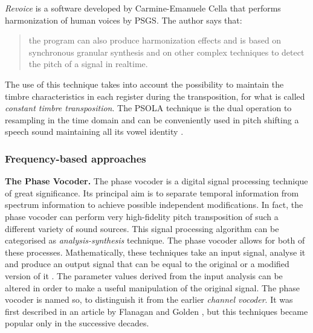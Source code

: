 \emph{Revoice} is a software developed by Carmine-Emanuele Cella that performs harmonization of human voices by PSGS. The author says that:

\begin{quote}
\scriptsize{the program can also produce harmonization effects and is based on synchronous granular synthesis and on other complex techniques to detect the pitch of a signal in realtime.
}
\end{quote}

The use of this technique takes into account the possibility to maintain the timbre characteristics in each register during the transposition, for what is called \emph{constant timbre transposition}. The PSOLA technique is the dual operation to resampling in the time domain and can be conveniently used in pitch shifting a speech sound maintaining all its vowel identity \cite{zolder2011dafx}.

\subsubsection{Frequency-based approaches}
\label{subsec:freq}

\textbf{The Phase Vocoder.}
The phase vocoder is a digital signal processing technique of great significance. Its principal aim is to separate temporal information from spectrum information to achieve possible independent modifications. In fact, the phase vocoder can perform very high-fidelity pitch transposition of such a different variety of sound sources. This signal processing algorithm can be categorised as \emph{analysis-synthesis} technique. The phase vocoder allows for both of these processes. Mathematically, these techniques take an input signal, analyse it and produce an output signal that can be equal to the original or a modified version of it \cite{dolson1986tutorial}. The parameter values derived from the input analysis can be altered in order to make a useful manipulation of the original signal. The phase vocoder is named so, to distinguish it from the earlier \emph{channel vocoder}. It was first described in an article by Flanagan and Golden \cite{flanagan1966vocoder}, but this techniques became popular only in the successive decades.

